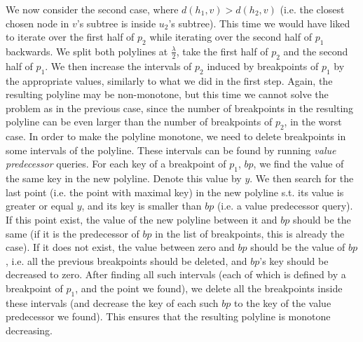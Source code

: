 \documentclass[11pt,a4paper]{article}
\theoremstyle{definition}
\theoremstyle{remark}
\begin{document}
\begin{enumerate}
We now consider the second case, where $d(h_1,v) > d(h_2,v)$ (i.e. the closest chosen node in $v$'s subtree is inside $u_2$'s subtree). This time we would have liked to iterate over the first half of $p_2$ while iterating over the second half of $p_1$ backwards. We split both polylines at $\frac{\lambda}{2}$, take the first half of $p_2$ and the second half of $p_1$. We then increase the intervals of $p_2$ induced by breakpoints of $p_1$ by the appropriate values, similarly to what we did in the first step. Again, the resulting polyline may be non-monotone, but this time we cannot solve the problem as in the previous case, since the number of breakpoints in the resulting polyline can be even larger than the number of breakpoints of $p_2$, in the worst case. In order to make the polyline monotone, we need to delete breakpoints in some intervals of the polyline. These intervals can be found by running \emph{value predecessor} queries. For each key of a breakpoint of $p_1$, $bp$, we find the value of the same key in the new polyline. Denote this value by $y$. We then search for the last point (i.e. the point with maximal key) in the new polyline s.t. its value is greater or equal $y$, and its key is smaller than $bp$ (i.e. a value predecessor query). If this point exist, the value of the new polyline between it and $bp$ should be the same (if it is the predecessor of $bp$ in the list of breakpoints, this is already the case). If it does not exist, the value between zero and $bp$ should be the value of $bp$, i.e. all the previous breakpoints should be deleted, and $bp$'s key should be decreased to zero. After finding all such intervals (each of which is defined by a breakpoint of $p_1$, and the point we found), we delete all the breakpoints inside these intervals (and decrease the key of each such $bp$ to the key of the value predecessor we found). This ensures that the resulting polyline is monotone decreasing.
\begin{figure}[h]
\begin{center}

\end{center}
\end{figure}
\end{enumerate}
\end{document}

